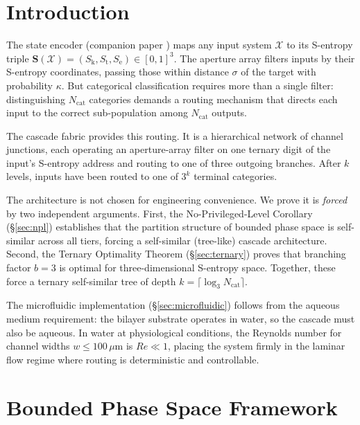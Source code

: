 \documentclass[11pt,twocolumn,a4paper]{article}
\theoremstyle{remark}
\newcommand{\Sk}{S_{\mathrm{k}}}
\newcommand{\St}{S_{\mathrm{t}}}
\newcommand{\Se}{S_{\mathrm{e}}}
\newcommand{\Sent}{\bm{S}}
\newcommand{\kap}{\kappa}
\begin{document}
\section{Introduction}
\label{sec:introduction}

The state encoder (companion paper \citep{companion2}) maps any input system
$\mathcal{X}$ to its S-entropy triple $\Sent(\mathcal{X}) = (\Sk, \St, \Se)
\in [0,1]^3$. The aperture array \citep{companion3} filters inputs by their
S-entropy coordinates, passing those within distance $\sigma$ of the target
with probability $\kap$. But categorical classification requires more than
a single filter: distinguishing $N_{\mathrm{cat}}$ categories demands a
routing mechanism that directs each input to the correct sub-population among
$N_{\mathrm{cat}}$ outputs.

The cascade fabric provides this routing. It is a hierarchical network of
channel junctions, each operating an aperture-array filter on one ternary digit
of the input's S-entropy address and routing to one of three outgoing branches.
After $k$ levels, inputs have been routed to one of $3^k$ terminal categories.

The architecture is not chosen for engineering convenience. We prove it is
\emph{forced} by two independent arguments. First, the No-Privileged-Level
Corollary (\S\ref{sec:npl}) establishes that the partition structure of bounded
phase space is self-similar across all tiers, forcing a self-similar (tree-like)
cascade architecture. Second, the Ternary Optimality Theorem (\S\ref{sec:ternary})
proves that branching factor $b = 3$ is optimal for three-dimensional S-entropy
space. Together, these force a ternary self-similar tree of depth $k = \lceil
\log_3 N_{\mathrm{cat}} \rceil$.

The microfluidic implementation (\S\ref{sec:microfluidic}) follows from the aqueous
medium requirement: the bilayer substrate operates in water, so the cascade must
also be aqueous. In water at physiological conditions, the Reynolds number for
channel widths $w \leq 100\,\mu$m is $Re \ll 1$, placing the system firmly in
the laminar flow regime where routing is deterministic and controllable.

\section{Bounded Phase Space Framework}
\label{sec:bps}
\end{document}

